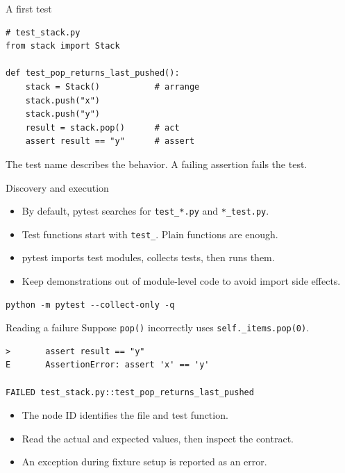 \documentclass[aspectratio=169,11pt]{beamer}
\newcommand{\code}[1]{\texttt{#1}}
\begin{document}
\begin{frame}[fragile]{A first test}
\begin{lstlisting}
# test_stack.py
from stack import Stack

def test_pop_returns_last_pushed():
    stack = Stack()           # arrange
    stack.push("x")
    stack.push("y")
    result = stack.pop()      # act
    assert result == "y"      # assert
\end{lstlisting}
The test name describes the behavior. A failing assertion fails the test.
\end{frame}

\begin{frame}[fragile]{Discovery and execution}
\begin{itemize}
\item By default, pytest searches for \code{test\_*.py} and \code{*\_test.py}.
\item Test functions start with \code{test\_}. Plain functions are enough.
\item pytest imports test modules, collects tests, then runs them.
\item Keep demonstrations out of module-level code to avoid import side effects.
\end{itemize}\begin{lstlisting}
python -m pytest --collect-only -q
\end{lstlisting}

\end{frame}

\begin{frame}[fragile]{Reading a failure}
Suppose \code{pop()} incorrectly uses \code{self.\_items.pop(0)}.
\begin{lstlisting}
>       assert result == "y"
E       AssertionError: assert 'x' == 'y'

FAILED test_stack.py::test_pop_returns_last_pushed
\end{lstlisting}
\begin{itemize}
\item The node ID identifies the file and test function.
\item Read the actual and expected values, then inspect the contract.
\item An exception during fixture setup is reported as an error.
\end{itemize}
\end{frame}
\end{document}
